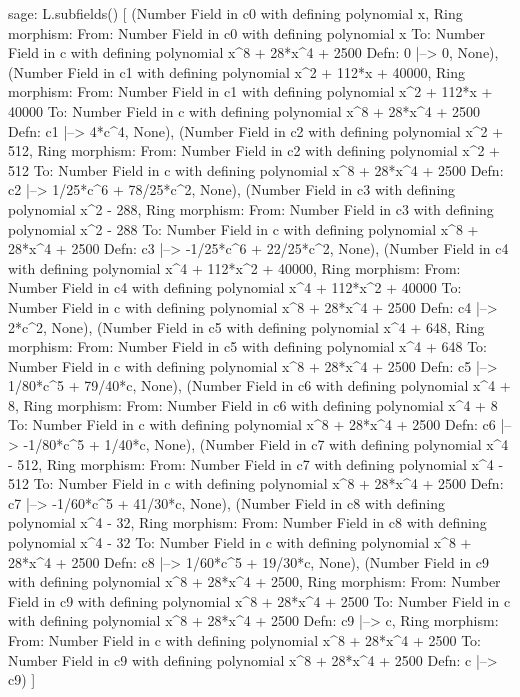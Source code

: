 \begin{sageexample}
sage: L.subfields()
[
(Number Field in c0 with defining polynomial x,
 Ring morphism:
   From: Number Field in c0 with defining polynomial x
   To:   Number Field in c with defining polynomial x^8 + 28*x^4 + 2500
   Defn: 0 |--> 0,
 None),
(Number Field in c1 with defining polynomial x^2 + 112*x + 40000,
 Ring morphism:
   From: Number Field in c1 with defining polynomial x^2 + 112*x + 40000
   To:   Number Field in c with defining polynomial x^8 + 28*x^4 + 2500
   Defn: c1 |--> 4*c^4,
 None),
(Number Field in c2 with defining polynomial x^2 + 512,
 Ring morphism:
   From: Number Field in c2 with defining polynomial x^2 + 512
   To:   Number Field in c with defining polynomial x^8 + 28*x^4 + 2500
   Defn: c2 |--> 1/25*c^6 + 78/25*c^2,
 None),
(Number Field in c3 with defining polynomial x^2 - 288,
 Ring morphism:
   From: Number Field in c3 with defining polynomial x^2 - 288
   To:   Number Field in c with defining polynomial x^8 + 28*x^4 + 2500
   Defn: c3 |--> -1/25*c^6 + 22/25*c^2,
 None),
(Number Field in c4 with defining polynomial x^4 + 112*x^2 + 40000,
 Ring morphism:
   From: Number Field in c4 with defining polynomial x^4 + 112*x^2 + 40000
   To:   Number Field in c with defining polynomial x^8 + 28*x^4 + 2500
   Defn: c4 |--> 2*c^2,
 None),
(Number Field in c5 with defining polynomial x^4 + 648,
 Ring morphism:
   From: Number Field in c5 with defining polynomial x^4 + 648
   To:   Number Field in c with defining polynomial x^8 + 28*x^4 + 2500
   Defn: c5 |--> 1/80*c^5 + 79/40*c,
 None),
(Number Field in c6 with defining polynomial x^4 + 8,
Ring morphism:
  From: Number Field in c6 with defining polynomial x^4 + 8
  To:   Number Field in c with defining polynomial x^8 + 28*x^4 + 2500
  Defn: c6 |--> -1/80*c^5 + 1/40*c,
  None),
(Number Field in c7 with defining polynomial x^4 - 512,
 Ring morphism:
   From: Number Field in c7 with defining polynomial x^4 - 512
   To:   Number Field in c with defining polynomial x^8 + 28*x^4 + 2500
   Defn: c7 |--> -1/60*c^5 + 41/30*c,
 None),
(Number Field in c8 with defining polynomial x^4 - 32,
 Ring morphism:
   From: Number Field in c8 with defining polynomial x^4 - 32
   To:   Number Field in c with defining polynomial x^8 + 28*x^4 + 2500
   Defn: c8 |--> 1/60*c^5 + 19/30*c,
 None),
(Number Field in c9 with defining polynomial x^8 + 28*x^4 + 2500,
 Ring morphism:
   From: Number Field in c9 with defining polynomial x^8 + 28*x^4 + 2500
   To:   Number Field in c with defining polynomial x^8 + 28*x^4 + 2500
   Defn: c9 |--> c,
 Ring morphism:
   From: Number Field in c with defining polynomial x^8 + 28*x^4 + 2500
   To:   Number Field in c9 with defining polynomial x^8 + 28*x^4 + 2500
   Defn: c |--> c9)
]
\end{sageexample}

